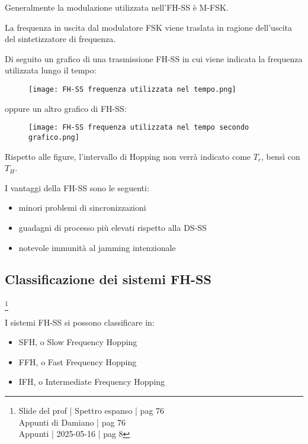 Generalmente la modulazione utilizzata nell'FH-SS è M-FSK. \newline 

La frequenza in uscita dal modulatore FSK viene traslata in ragione dell'uscita del sintetizzatore di frequenza. \newline 

\newpage 

Di seguito un grafico di una trasmissione FH-SS 
in cui viene indicata la frequenza utilizzata lungo il tempo: 

\begin{figure}[h]
    \centering
    \texttt{[image: FH-SS frequenza utilizzata nel tempo.png]}
\end{figure}

oppure un altro grafico di FH-SS: 

\begin{figure}[h]
    \centering
    \texttt{[image: FH-SS frequenza utilizzata nel tempo secondo grafico.png]}
\end{figure}

Rispetto alle figure, l'intervallo di Hopping non verrà indicato come $T_c$, 
bensì con $T_H$. \newline 

I vantaggi della FH-SS sono le seguenti: 

\begin{itemize}
    \item minori problemi di sincronizzazioni 
    \item guadagni di processo più elevati rispetto alla DS-SS 
    \item notevole immunità al jamming intenzionale
\end{itemize}


\newpage 

\subsection{Classificazione dei sistemi FH-SS}
\footnote{Slide del prof | Spettro espanso | pag 76 \\
Appunti di Damiano | pag 76 \\
Appunti | 2025-05-16 | pag 8 
} 

I sistemi FH-SS si possono classificare in: 

\begin{itemize}
    \item SFH, o Slow Frequency Hopping 
    \item FFH, o Fast Frequency Hopping 
    \item IFH, o Intermediate Frequency Hopping
\end{itemize}

